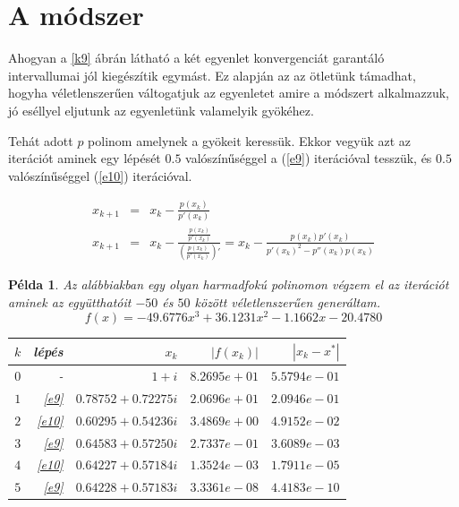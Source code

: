 \documentclass[a4paper,12pt]{report}
\newtheorem{Pl}[Tet]{Példa}
\begin{document}
            \section{A módszer}
            
            Ahogyan a \ref{k9} ábrán látható a két egyenlet konvergenciát garantáló intervallumai jól kiegészítik egymást. Ez alapján az az ötletünk támadhat, hogyha véletlenszerűen váltogatjuk az egyenletet amire a módszert alkalmazzuk, jó eséllyel eljutunk az egyenletünk valamelyik gyökéhez.
			
			Tehát adott $p$ polinom amelynek a gyökeit keressük. Ekkor vegyük azt az iterációt aminek egy lépését $0.5$ valószínűséggel a (\ref{e9}) iterációval tesszük, és $0.5$ valószínűséggel (\ref{e10}) iterációval. 
			
			\begin{eqnarray}
				\label{e9}x_{k+1}&=&x_k- \frac{p(x_k)}{p'(x_k)}\\
				\label{e10}x_{k+1}&=&x_k-\frac{\frac{p(x_k)}{p'(x_k)}}{\left(\frac{p(x_k)}{p'(x_k)}\right)'}=x_k-\frac{p(x_k)p'(x_k)}{p'(x_k)^2-p''(x_k)p(x_k)}
			\end{eqnarray}
			
            \begin{Pl} Az alábbiakban egy olyan harmadfokú polinomon végzem el az iterációt aminek az együtthatóit $-50$ és $50$ között véletlenszerűen generáltam.
            	\[f(x)=-49.6776x^3+36.1231x^2-1.1662x-20.4780\]
                \begin{center}
                \begin{tabular}{|r|r|r|r|r|}
               		\hline
                	$k$ & lépés     & $x_k$                 & $|f(x_k)|$   & $|x_k-x^*|$  \\ \hline
                	$0$ & -         & $1+i$                 & $8.2695e+01$ & $5.5794e-01$ \\ 
                	$1$ & \ref{e9}  & $0.78752 + 0.72275i$  & $2.0696e+01$ & $2.0946e-01$ \\ 
                	$2$ & \ref{e10} & $0.60295 + 0.54236i$  & $3.4869e+00$ & $4.9152e-02$ \\ 
                	$3$ & \ref{e9}  & $0.64583 + 0.57250i$  & $2.7337e-01$ & $3.6089e-03$ \\ 
                	$4$ & \ref{e10} & $0.64227 + 0.57184i $ & $1.3524e-03$ & $1.7911e-05$ \\ 
                	$5$ & \ref{e9}  & $0.64228 + 0.57183i$  & $3.3361e-08$ & $4.4183e-10$ \\
                	\hline
                \end{tabular}
                \end{center}
                
            \end{Pl}
            	
\end{document}

